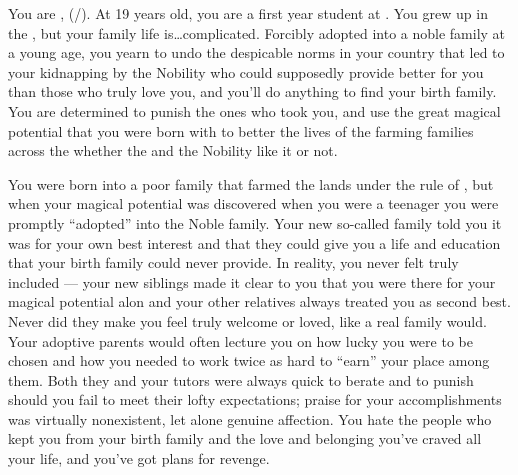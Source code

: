 \documentclass[char]{GL2020}
\begin{document}
\name{\cAdopted{}}

You are \cAdopted{\full}, (\cAdopted{\they}/\cAdopted{\them}). At 19 years old, you are a first year student at \pSchool{}. You grew up in the \pFarm{}, but your family life is\ldots{}complicated. Forcibly adopted into a noble family at a young age, you yearn to undo the despicable norms in your country that led to your kidnapping by the Nobility who could supposedly provide better for you than those who truly love you, and you'll do anything to find your birth family. You are determined to punish the ones who took you, and use the great magical potential that you were born with to better the lives of the farming families across the \pFarm{} whether the \cQueen{\Monarch} and the Nobility like it or not.

You were born into a poor family that farmed the lands under the rule of \cAdoptedParentOne{\full}, but when your magical potential was discovered when you were a teenager you were promptly ``adopted'' into the Noble \cAdoptedParentOne{\formal} family. Your new so-called family told you it was for your own best interest and that they could give you a life and education that your birth family could never provide. In reality, you never felt truly included — your new siblings made it clear to you that you were there for your magical potential alon and your other relatives always treated you as second best. Never did they make you feel truly welcome or loved, like a real family would. Your adoptive parents would often lecture you on how lucky you were to be chosen and how you needed to work twice as hard to ``earn” your place among them. Both they and your tutors were always quick to berate and to punish should you fail to meet their lofty expectations; praise for your accomplishments was virtually nonexistent, let alone genuine affection. You hate the people who kept you from your birth family and the love and belonging you've craved all your life, and you've got plans for revenge.  
\end{document}
